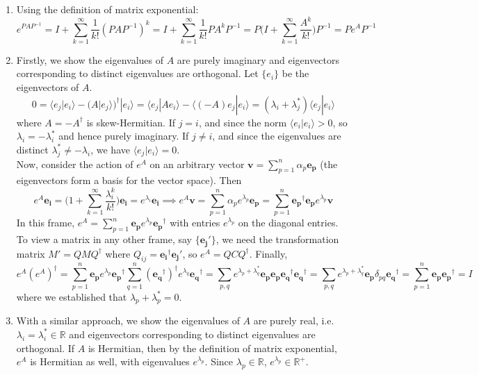 \documentclass[a4paper]{article}
\begin{document}
\begin{ans}\leavevmode
\begin{enumerate}[label=(\alph*)]
\item Using the definition of matrix exponential:
$$e^{PAP^{-1}}=I+\sum_{k=1}^\infty\frac{1}{k!}(PAP^{-1})^k=I+\sum_{k=1}^\infty\frac{1}{k!}PA^kP^{-1}=P\bigg(I+\sum_{k=1}^\infty\frac{A^k}{k!}\bigg)P^{-1}=Pe^AP^{-1}$$
\item Firstly, we show the eigenvalues of $A$ are purely imaginary and eigenvectors corresponding to distinct eigenvalues are orthogonal. Let $\{e_i\}$ be the eigenvectors of $A$.
$$0=\langle e_j|e_i\rangle-(A|e_j\rangle)^\dag|e_i\rangle=\langle e_j|Ae_i\rangle-\langle(-A)e_j|e_i\rangle=(\lambda_i+\lambda_j^*)\langle e_j|e_i\rangle$$
where $A=-A^\dag$ is skew-Hermitian. If $j=i$, and since the norm $\langle e_i|e_i\rangle> 0$, so  $\lambda_i=-\lambda_i^*$ and hence purely imaginary. If $j\neq i$, and since the eigenvalues are distinct $\lambda_j^*\neq-\lambda_i$, we have $\langle e_j|e_i\rangle=0$.\\[5pt]
Now, consider the action of $e^A$ on an arbitrary vector $\mathbf{v}=\sum_{p=1}^n\alpha_p\mathbf{e_p}$ (the eigenvectors form a basis for the vector space). Then
$$e^A\mathbf{e_i}=\bigg(1+\sum_{k=1}^\infty\frac{\lambda_i^k}{k!}\bigg)\mathbf{e_i}=e^{\lambda_i}\mathbf{e_i}\implies e^A\mathbf{v}=\sum_{p=1}^n\alpha_pe^{\lambda_p}\mathbf{e_p}=\sum_{p=1}^n\mathbf{e_p}^\dag\mathbf{e_p}e^{\lambda_p}\mathbf{v}$$
In this frame, $e^A=\sum_{p=1}^n\mathbf{e_p}e^{\lambda_p}\mathbf{e_p}^\dag$ with entries $e^{\lambda_p}$ on the diagonal entries. To view a matrix in any other frame, say $\{\mathbf{e_j'}\}$, we need the transformation matrix $M'=QMQ^\dag$ where $Q_{ij}=\mathbf{e_i}^\dag\mathbf{e_j'}$, so $e^A=QCQ^\dag$. Finally,
$$e^A(e^A)^\dag=\sum_{p=1}^n\mathbf{e_p}e^{\lambda_p}\mathbf{e_p}^\dag\sum_{q=1}^n(\mathbf{e_q}^\dag)^\dag e^{\lambda_q}\mathbf{e_q}^\dag=\sum_{p,q}e^{\lambda_p+\lambda_q^*}\mathbf{e_p}\mathbf{e_p}\mathbf{e_q}^\dag\mathbf{e_q}^\dag=\sum_{p,q}e^{\lambda_p+\lambda_q^*}\mathbf{e_p}\delta_{pq}\mathbf{e_q}^\dag=\sum_{p=1}^n\mathbf{e_p}\mathbf{e_p}^\dag=I$$
where we established that $\lambda_p+\lambda_p^*=0$.
\item With a similar approach, we show the eigenvalues of $A$ are purely real, i.e. $\lambda_i=\lambda_i^*\in\mathbb{R}$ and eigenvectors corresponding to distinct eigenvalues are orthogonal. If $A$ is Hermitian, then by the definition of matrix exponential, $e^A$ is Hermitian as well, with eigenvalues $e^{\lambda_p}$. Since $\lambda_p\in\mathbb{R}$, $e^{\lambda_p}\in\mathbb{R}^+$.
\end{enumerate}
\end{ans}
\end{document}
